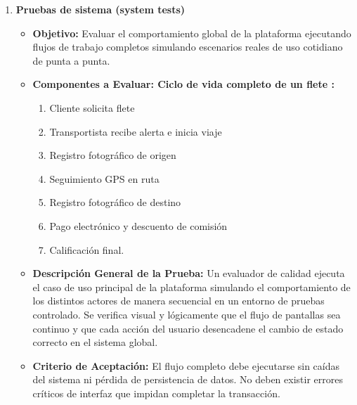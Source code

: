 \begin{enumerate}
\begin{itemize}
		\item \textbf{Descripción general de la prueba:} Se ejecutan llamadas de prueba entre subsistemas combinados para verificar que los datos se transmitan, transformen y almacenen correctamente. Se valida que la información viaje cifrada por canales seguros, que las conexiones concurrentes de mensajería mantengan la sincronización mutua y que la persistencia de archivos de evidencias guarde simultáneamente los registros correspondientes en la base de datos sin romper la integridad referencial. 
		\item \textbf{Criterio de Aceptación:} Los módulos deben integrarse sin lanzar excepciones de comunicación o inconsistencias en la base de datos. Los tiempos de respuesta de la API en condiciones normales deben situarse por debajo de los 500ms.
	\end{itemize}
	\item \textbf{Pruebas de sistema (system tests)}
	\begin{itemize}
		\item \textbf{Objetivo:} Evaluar el comportamiento global de la plataforma ejecutando flujos de trabajo completos simulando escenarios reales de uso cotidiano de punta a punta.
		\item\textbf{Componentes a Evaluar: Ciclo de vida completo de un flete : }
		\begin{enumerate}
			\item Cliente solicita flete 
			\item Transportista recibe alerta e inicia viaje
			\item Registro fotográfico de origen 
			\item Seguimiento GPS en ruta 
			\item Registro fotográfico de destino 
			\item Pago electrónico y descuento de comisión 
			\item Calificación final.
		\end{enumerate}
		\item \textbf{Descripción General de la Prueba:} Un evaluador de calidad ejecuta el caso de uso principal de la plataforma simulando el comportamiento de los distintos actores de manera secuencial en un entorno de pruebas controlado. Se verifica visual y lógicamente que el flujo de pantallas sea continuo y que cada acción del usuario desencadene el cambio de estado correcto en el sistema global.
		\item  \textbf{Criterio de Aceptación:} El flujo completo debe ejecutarse sin caídas del sistema ni pérdida de persistencia de datos. No deben existir errores críticos de interfaz que impidan completar la transacción.	

\end{itemize}
\end{enumerate}
